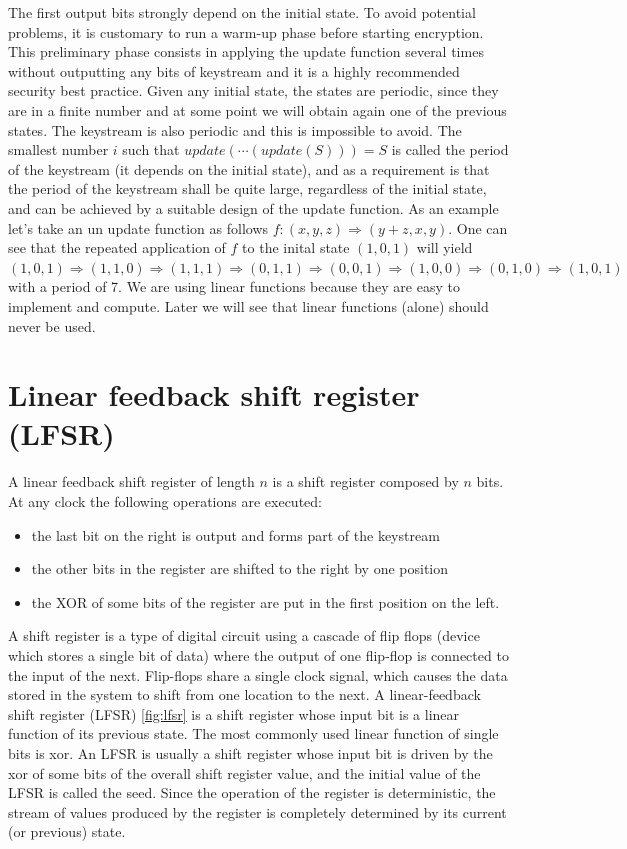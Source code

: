 The first output bits strongly depend on the initial state. To avoid potential problems, it is customary to run a warm-up phase before starting encryption. This preliminary phase consists in applying the update function several times without outputting any bits of keystream and it is a highly recommended security best practice.
Given any initial state, the states are periodic, since they are in a finite number and at some point we will obtain again one of the previous states. The keystream is also periodic and this is impossible to avoid. The smallest number $i$ such that $update(\cdots(update(S)))=S$ is called the period of the keystream (it depends on the initial state), and as a requirement is that the period of the keystream shall be quite large, regardless of the initial state, and can be achieved by a suitable design of the update function.
As an example let's take an un update function as follows $f: (x,y,z) \Rightarrow (y+z,x,y)$. One can see that the repeated application of $f$ to the inital state $(1,0,1)$ will yield $(1,0,1) \Rightarrow (1,1,0) \Rightarrow (1,1,1) \Rightarrow (0,1,1) \Rightarrow (0,0,1) \Rightarrow (1,0,0) \Rightarrow (0,1,0) \Rightarrow (1,0,1)$ with a period of 7.
We are using linear functions because they are easy to implement and compute. Later we will see that linear functions (alone) should never be used.

\section{Linear feedback shift register (LFSR)}

A linear feedback shift register of length $n$ is a shift register composed by $n$ bits.
At any clock the following operations are executed:
\begin{itemize}
	\item the last bit on the right is output and forms part of the keystream
	\item the other bits in the register are shifted to the right by one position
	\item the XOR of some bits of the register are put in the first position on the left.
\end{itemize}

A shift register is a type of digital circuit using a cascade of flip flops (device which stores a single bit of data) where the output of one flip-flop is connected to the input of the next. Flip-flops share a single clock signal, which causes the data stored in the system to shift from one location to the next. 
A linear-feedback shift register (LFSR) \ref{fig:lfsr} is a shift register whose input bit is a linear function of its previous state. The most commonly used linear function of single bits is xor. An LFSR is usually a shift register whose input bit is driven by the xor of some bits of the overall shift register value, and the initial value of the LFSR is called the seed. Since the operation of the register is deterministic, the stream of values produced by the register is completely determined by its current (or previous) state.

